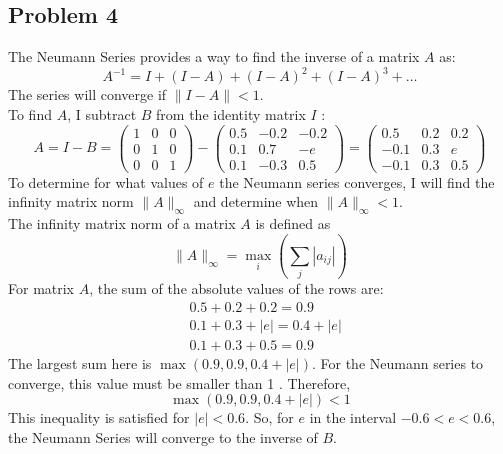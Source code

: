 \documentclass[manuscript,screen,review]{acmart}
\begin{document}
\subsection*{Problem 4}
The Neumann Series provides a way to find the inverse of a matrix 
$A$ as:
$$
A^{-1}=I+(I-A)+(I-A)^2+(I-A)^3+\ldots
$$
The series will converge if $\|I-A\|<1$.
\\
To find $A$, I subtract $B$ from the identity matrix $I$ :
$$
A=I-B=\left(\begin{array}{lll}
1 & 0 & 0 \\
0 & 1 & 0 \\
0 & 0 & 1
\end{array}\right)-\left(\begin{array}{ccc}
0.5 & -0.2 & -0.2 \\
0.1 & 0.7 & -e \\
0.1 & -0.3 & 0.5
\end{array}\right)=\left(\begin{array}{ccc}
0.5 & 0.2 & 0.2 \\
-0.1 & 0.3 & e \\
-0.1 & 0.3 & 0.5
\end{array}\right)
$$
To determine for what values of $e$ the Neumann series converges, I will find the infinity matrix norm $\|A\|_{\infty}$ and determine when $\|A\|_{\infty}<1$.
\\
The infinity matrix norm of a matrix $A$ is defined as
$$
\|A\|_{\infty}=\max _i\left(\sum_j\left|a_{i j}\right|\right)
$$
For matrix $A$, the sum of the absolute values of the rows are:
$$
\begin{aligned}
& 0.5+0.2+0.2=0.9 \\
& 0.1+0.3+|e|=0.4+|e| \\
& 0.1+0.3+0.5=0.9
\end{aligned}
$$
The largest sum here is $\max (0.9,0.9,0.4+|e|)$.
For the Neumann series to converge, this value must be smaller than 1 . Therefore,
$$
\max (0.9,0.9,0.4+|e|)<1
$$
This inequality is satisfied for $|e|<0.6$.
So, for $e$ in the interval $-0.6<e<0.6$, the Neumann Series will converge to the inverse of $B$.
\end{document}
